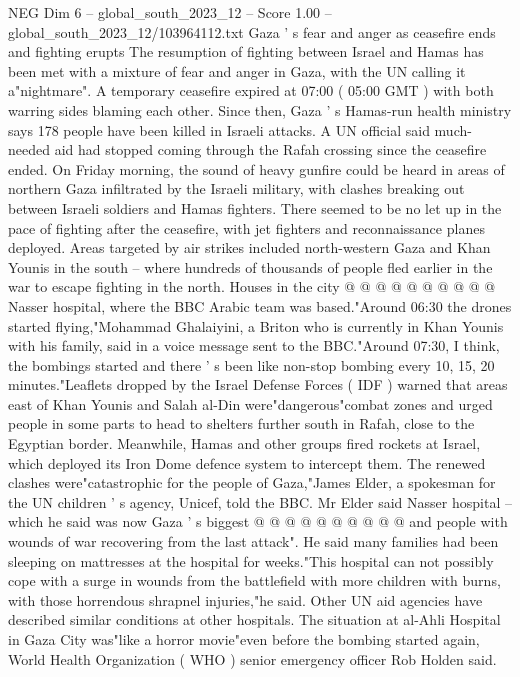 \begin{textsample}{NEG Dim 6 – global\_south\_2023\_12 – Score 1.00 – global\_south\_2023\_12/103964112.txt}  \label{ex:f6_neg_322}
Gaza ' s fear and anger as ceasefire ends and fighting erupts The resumption of fighting between Israel and Hamas has been met with a mixture of fear and anger in Gaza, with the UN calling it a"nightmare".
A temporary ceasefire expired at 07:00 ( 05:00 GMT ) with both warring sides blaming each other.
Since then, Gaza ' s Hamas-run health ministry says 178 people have been killed in Israeli attacks.
A UN official said much-needed aid had stopped coming through the Rafah crossing since the ceasefire ended.
On Friday morning, the sound of heavy gunfire could be heard in areas of northern Gaza infiltrated by the Israeli military, with clashes breaking out between Israeli soldiers and Hamas fighters.
There seemed to be no let up in the pace of fighting after the ceasefire, with jet fighters and reconnaissance planes deployed.
Areas targeted by air strikes included north-western Gaza and Khan Younis in the south -- where hundreds of thousands of people fled earlier in the war to escape fighting in the north.
Houses in the city @ @ @ @ @ @ @ @ @ @ Nasser hospital, where the BBC Arabic team was based."Around 06:30 the drones started flying,"Mohammad Ghalaiyini, a Briton who is currently in Khan Younis with his family, said in a voice message sent to the BBC."Around 07:30, I think, the bombings started and there ' s been like non-stop bombing every 10, 15, 20 minutes."Leaflets dropped by the Israel Defense Forces ( IDF ) warned that areas east of Khan Younis and Salah al-Din were"dangerous"combat zones and urged people in some parts to head to shelters further south in Rafah, close to the Egyptian border.
Meanwhile, Hamas and other groups fired rockets at Israel, which deployed its Iron Dome defence system to intercept them.
The renewed clashes were"catastrophic for the people of Gaza,"James Elder, a spokesman for the UN children ' s agency, Unicef, told the BBC.
Mr Elder said Nasser hospital -- which he said was now Gaza ' s biggest @ @ @ @ @ @ @ @ @ @ and people with wounds of war recovering from the last attack".
He said many families had been sleeping on mattresses at the hospital for weeks."This hospital can not possibly cope with a surge in wounds from the battlefield with more children with burns, with those horrendous shrapnel injuries,"he said.
Other UN aid agencies have described similar conditions at other hospitals.
The situation at al-Ahli Hospital in Gaza City was"like a horror movie"even before the bombing started again, World Health Organization ( WHO ) senior emergency officer Rob Holden said.

\end{textsample}
